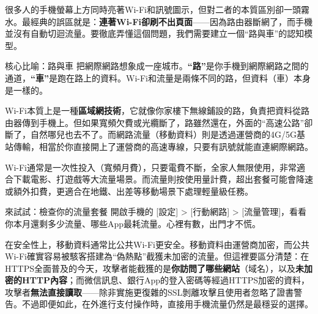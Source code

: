 


很多人的手機螢幕上方同時亮著Wi-Fi和訊號圖示，但對二者的本質區別卻一頭霧水。最經典的誤區就是：\textbf{連著Wi-Fi卻刷不出頁面}——因為路由器斷網了，而手機並沒有自動切迴流量。要徹底弄懂這個問題，我們需要建立一個“路與車”的認知模型。

\begin{tcbinfo}{核心比喻：路與車}
把網際網路想象成一座城市。\textbf{“路”}是你手機到網際網路之間的通道，\textbf{“車”}是跑在路上的資料。Wi-Fi和流量是兩條不同的路，但資料（車）本身是一樣的。

\end{tcbinfo}


Wi-Fi本質上是一種\textbf{區域網技術}，它就像你家樓下無線鋪設的路，負責把資料從路由器傳到手機上。但如果寬頻欠費或光纜斷了，路雖然還在，外面的“高速公路”卻斷了，自然哪兒也去不了。而網路流量（移動資料）則是透過運營商的4G/5G基站傳輸，相當於你直接開上了運營商的高速專線，只要有訊號就能直連網際網路。


Wi-Fi通常是一次性投入（寬頻月費），只要電費不斷，全家人無限使用，非常適合下載電影、打遊戲等大流量場景。而流量則按使用量計費，超出套餐可能會降速或額外扣費，更適合在地鐵、出差等移動場景下處理輕量級任務。

\begin{tcbpractice}{來試試：檢查你的流量套餐}
開啟手機的 [設定] > [行動網路] > [流量管理]，看看你本月還剩多少流量、哪些App最耗流量。心裡有數，出門才不慌。

\end{tcbpractice}


在安全性上，移動資料通常比公共Wi-Fi更安全。移動資料由運營商加密，而公共Wi-Fi確實容易被駭客搭建為“偽熱點”截獲未加密的流量。但這裡要區分清楚：在HTTPS全面普及的今天，攻擊者能截獲的是\textbf{你訪問了哪些網站}（域名），以及\textbf{未加密的HTTP內容}；而微信訊息、銀行App的登入密碼等經過HTTPS加密的資料，攻擊者\textbf{無法直接讀取}——除非實施更復雜的SSL剝離攻擊且使用者忽略了證書警告。不過即便如此，在外進行支付操作時，直接用手機流量仍然是最穩妥的選擇。

